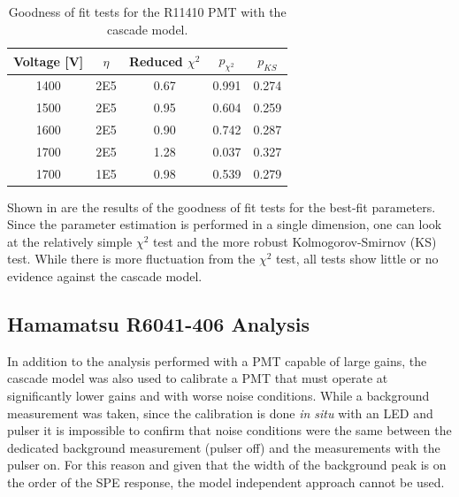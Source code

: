 \begin{table}
\centering

\begin{tabular}{|c|c|c|c|c|}
\hline
Voltage {[}V{]} & $\eta$ & Reduced $\chi^2$ & $p_{\chi^2}$ & $p_{KS}$  \\ \hline
1400 & 2E5 & 0.67 & 0.991 & 0.274 \\ \hline
1500 & 2E5 & 0.95 & 0.604 & 0.259 \\ \hline
1600 & 2E5 & 0.90 & 0.742 & 0.287 \\ \hline
1700 & 2E5 & 1.28 & 0.037 & 0.327 \\ \hline
1700 & 1E5 & 0.98 & 0.539 & 0.279 \\ \hline

\end{tabular}
\caption{Goodness of fit tests for the R11410 PMT with the cascade model.}
\label{tab-gof}

\end{table}

Shown in  are the results of the goodness of fit tests for the best-fit parameters.  Since the parameter estimation is performed in a single dimension, one can look at the relatively simple $\chi^2$ test and the more robust Kolmogorov-Smirnov (KS) test.  While there is more fluctuation from the $\chi^2$ test, all tests show little or no evidence against the cascade model.





\subsection{Hamamatsu R6041-406 Analysis}
\label{sec:pmt_nerix_analysis}





In addition to the analysis performed with a PMT capable of large gains, the cascade model was also used to calibrate a PMT that must operate at significantly lower gains and with worse noise conditions.  While a background measurement was taken, since the calibration is done \textit{in situ} with an LED and pulser it is impossible to confirm that noise conditions were the same between the dedicated background measurement (pulser off) and the measurements with the pulser on.  For this reason and given that the width of the background peak is on the order of the SPE response, the model independent approach cannot be used.  


